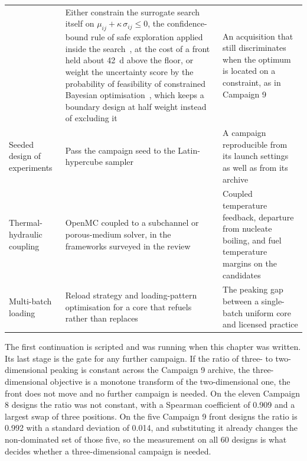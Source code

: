 \begin{table}[htbp]
\begin{tabularx}{\textwidth}{@{}>{\raggedright\arraybackslash}p{3.6cm}>{\raggedright\arraybackslash}X>{\raggedright\arraybackslash}p{4.0cm}@{}}
      & Either constrain the surrogate search itself on $\mu_{ij} + \kappa\,\sigma_{ij} \le 0$, the confidence-bound rule of safe exploration applied inside the search~\cite{sui_safeopt_2015}, at the cost of a front held about \SI{42}{d} above the floor, or weight the uncertainty score by the probability of feasibility of constrained Bayesian optimisation~\cite[Sec.~5.4.2]{forrester_book_2008}, which keeps a boundary design at half weight instead of excluding it
      & An acquisition that still discriminates when the optimum is located on a constraint, as in Campaign 9 \\
    \addlinespace
    Seeded design of experiments
      & Pass the campaign seed to the Latin-hypercube sampler
      & A campaign reproducible from its launch settings as well as from its archive \\
    \addlinespace
    Thermal-hydraulic coupling
      & OpenMC coupled to a subchannel or porous-medium solver, in the frameworks surveyed in the review
      & Coupled temperature feedback, departure from nucleate boiling, and fuel temperature margins on the candidates \\
    \addlinespace
    Multi-batch loading
      & Reload strategy and loading-pattern optimisation for a core that refuels rather than replaces
      & The peaking gap between a single-batch uniform core and licensed practice \\
    \bottomrule
  \end{tabularx}
\end{table}

The first continuation is scripted and was running when this chapter
was written. Its last stage is the gate for any further campaign. If
the ratio of three- to two-dimensional peaking is constant across the
Campaign 9 archive, the three-dimensional objective is a monotone
transform of the two-dimensional one, the front does not move and no
further campaign is needed. On the eleven Campaign 8 designs the ratio
was not constant, with a Spearman coefficient of 0.909 and a largest
swap of three positions. On the five Campaign 9 front designs the ratio
is 0.992 with a standard deviation of 0.014, and substituting it already
changes the non-dominated set of those five, so the measurement on all
60 designs is what decides whether a three-dimensional campaign is
needed.

